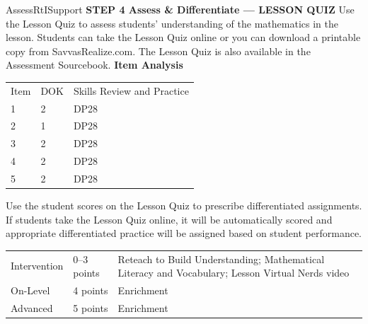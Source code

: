 \documentclass{article}
\newenvironment{te-addendum}[2]{}{}     %
\begin{document}
\begin{te-addendum}{Assess}{RtISupport}
\textbf{STEP 4 Assess & Differentiate — LESSON QUIZ}
Use the Lesson Quiz to assess students' understanding of the mathematics in the lesson.
Students can take the Lesson Quiz online or you can download a printable copy from SavvasRealize.com. The Lesson Quiz is also available in the Assessment Sourcebook.
\textbf{Item Analysis}
\begin{tabular}{lll}
Item & DOK & Skills Review and Practice \\
1 & 2 & DP28 \\
2 & 1 & DP28 \\
3 & 2 & DP28 \\
4 & 2 & DP28 \\
5 & 2 & DP28 \\
\end{tabular}
Use the student scores on the Lesson Quiz to prescribe differentiated assignments.
If students take the Lesson Quiz online, it will be automatically scored and appropriate differentiated practice will be assigned based on student performance.
\begin{tabular}{lll}
Intervention & 0–3 points & Reteach to Build Understanding; Mathematical Literacy and Vocabulary; Lesson Virtual Nerds video \\
On-Level & 4 points & Enrichment \\
Advanced & 5 points & Enrichment \\
\end{tabular}
\end{te-addendum}
\end{document}
